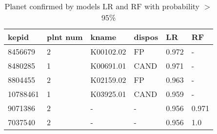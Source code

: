 \begin{table}[!htbp]
 \centering
 \caption{Planet confirmed by models LR and RF with probability $>$ 95\%}
 \label{dataLRRFcreftab} 
  \begin{tabular}
{| 
 p{}| 
 p{}| 
 p{}| 
 p{}| 
 p{}| 
 p{}| 
}\hline 
\textbf{kepid} &\textbf{plnt num} &\textbf{kname} &\textbf{dispos} &\textbf{LR} &\textbf{RF} \\ \hline 
8456679 &2 &K00102.02 &FP &0.972 &- \\ \hline 
8480285 &1 &K00691.01 &CAND &0.971 &- \\ \hline 
8804455 &2 &K02159.02 &FP &0.963 &- \\ \hline 
10788461 &1 &K03925.01 &CAND &0.959 &- \\ \hline 
9071386 &2 &- &- &0.956 &0.971 \\ \hline 
7037540 &2 &- &- &0.956 &1.0 \\ \hline 
\end{tabular} 
\end{table}